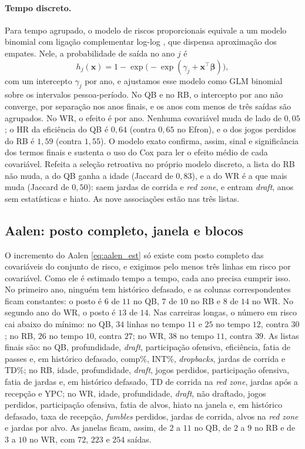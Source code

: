 \paragraph{Tempo discreto.}\label{subsec:apend_discreto}
Para tempo agrupado, o modelo de riscos proporcionais equivale a um modelo binomial com ligação complementar log-log \citep{prentice1978}, que dispensa aproximação dos empates. Nele, a probabilidade de saída no ano $j$ é
\begin{equation}
    h_j(\mathbf{x}) = 1 - \exp\!\big(-\exp(\gamma_j + \mathbf{x}^{\top}\boldsymbol{\beta})\big),
    \label{eq:cloglog}
\end{equation}
com um intercepto $\gamma_j$ por ano, e ajustamos esse modelo como GLM binomial sobre os intervalos pessoa-período. No QB e no RB, o intercepto por ano não converge, por separação nos anos finais, e os anos com menos de três saídas são agrupados. No WR, o efeito é por ano. Nenhuma covariável muda de lado de $0{,}05$; o HR da eficiência do QB é $0{,}64$ (contra $0{,}65$ no Efron), e o dos jogos perdidos do RB é $1{,}59$ (contra $1{,}55$). O modelo exato confirma, assim, sinal e significância dos termos finais e sustenta o uso do Cox para ler o efeito médio de cada covariável. Refeita a seleção retroativa no próprio modelo discreto, a lista do RB não muda, a do QB ganha a idade (Jaccard de $0{,}83$), e a do WR é a que mais muda (Jaccard de $0{,}50$): saem jardas de corrida e \textit{red zone}, e entram \textit{draft}, anos sem estatísticas e hiato. As nove associações estão nas três listas.

\subsection{Aalen: posto completo, janela e blocos}
\label{subsec:apend_janela}

O incremento do Aalen \eqref{eq:aalen_est} só existe com posto completo das covariáveis do conjunto de risco, e exigimos pelo menos três linhas em risco por covariável. Como ele é estimado tempo a tempo, cada ano precisa cumprir isso. No primeiro ano, ninguém tem histórico defasado, e as colunas correspondentes ficam constantes: o posto é $6$ de $11$ no QB, $7$ de $10$ no RB e $8$ de $14$ no WR. No segundo ano do WR, o posto é $13$ de $14$. Nas carreiras longas, o número em risco cai abaixo do mínimo: no QB, $34$ linhas no tempo $11$ e $25$ no tempo $12$, contra $30$; no RB, $26$ no tempo $10$, contra $27$; no WR, $38$ no tempo $11$, contra $39$. As listas finais são: no QB, profundidade, \textit{draft}, participação ofensiva, eficiência, fatia de passes e, em histórico defasado, comp\%, INT\%, \textit{dropbacks}, jardas de corrida e TD\%; no RB, idade, profundidade, \textit{draft}, jogos perdidos, participação ofensiva, fatia de jardas e, em histórico defasado, TD de corrida na \textit{red zone}, jardas após a recepção e YPC; no WR, idade, profundidade, \textit{draft}, não draftado, jogos perdidos, participação ofensiva, fatia de alvos, hiato na janela e, em histórico defasado, taxa de recepção, \textit{fumbles} perdidos, jardas de corrida, alvos na \textit{red zone} e jardas por alvo. As janelas ficam, assim, de $2$ a $11$ no QB, de $2$ a $9$ no RB e de $3$ a $10$ no WR, com $72$, $223$ e $254$ saídas.


